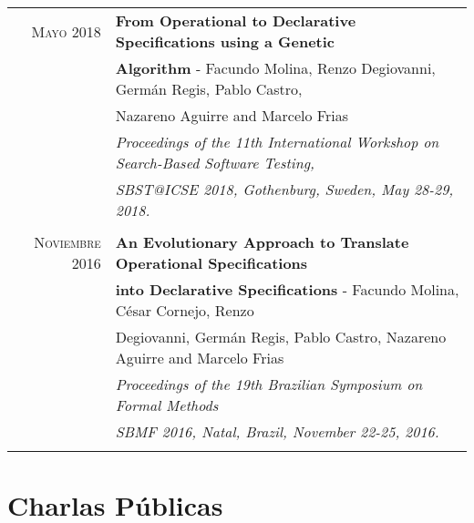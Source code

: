 \documentclass[a4paper,10pt]{article} %
\begin{document}
\begin{longtable}{rl}
\textsc{Mayo} 2018  & \textbf{From Operational to Declarative Specifications using a Genetic} \\ & \textbf{Algorithm} - Facundo Molina, Renzo Degiovanni, Germán Regis, Pablo Castro,\\
& Nazareno Aguirre and Marcelo Frias \\
& \textit{Proceedings of the 11th International Workshop on Search-Based Software Testing,} \\
& \textit{SBST@ICSE 2018, Gothenburg, Sweden, May 28-29, 2018.} \\ & \\

\textsc{Noviembre} 2016 & \textbf{An Evolutionary Approach to Translate Operational Specifications} \\ & \textbf{into Declarative Specifications} - Facundo Molina, César Cornejo, Renzo \\
& Degiovanni, Germán Regis, Pablo Castro, Nazareno Aguirre and Marcelo Frias \\
& \textit{Proceedings of the 19th Brazilian Symposium on Formal Methods} \\ 
& \textit{SBMF 2016, Natal, Brazil, November 22-25, 2016.} \\ & \\

\end{longtable}

\section{Charlas Públicas}
\end{document}
